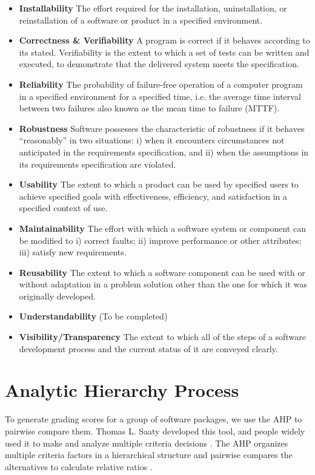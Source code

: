 \begin{itemize}
	\label{def_installability}
	\item \textbf{Installability} The effort required for the installation, uninstallation, or reinstallation of a software or product in a specified environment.
	\label{def_correctness_verifiability}
	\item \textbf{Correctness \& Verifiability} A program is correct if it behaves according to its stated. Verifiability is the extent to which a set of tests can be written and executed, to demonstrate that the delivered system meets the specification.
	\label{def_reliability}
	\item \textbf{Reliability} The probability of failure-free operation of a computer program in a specified environment for a specified time, i.e. the average time interval between two failures also known as the mean time to failure (MTTF).
	\label{def_robustness}
	\item \textbf{Robustness} Software possesses the characteristic of robustness if it behaves ``reasonably'' in two situations: i) when it encounters circumstances not anticipated in the requirements specification, and ii) when the assumptions in its requirements specification are violated.
	\label{def_usability}
	\item \textbf{Usability} The extent to which a product can be used by specified users to achieve specified goals with effectiveness, efficiency, and satisfaction in a specified context of use.
	\label{def_maintainability}
	\item \textbf{Maintainability} The effort with which a software system or component can be modified to i) correct faults; ii) improve performance or other attributes; iii) satisfy new requirements.
	\label{def_reusability}
	\item \textbf{Reusability} The extent to which a software component can be used with or without adaptation in a problem solution other than the one for which it was originally developed.
	\label{def_understandability}
	\item \textbf{Understandability} (To be completed)
	\label{def_visibility_transparency}
	\item \textbf{Visibility/Transparency} The extent to which all of the steps of a software development process and the current status of it are conveyed clearly.
\end{itemize}

\section{Analytic Hierarchy Process}
\label{sec_AHP}
To generate grading scores for a group of software packages, we use the AHP to pairwise compare them. Thomas L. Saaty developed this tool, and people widely used it to make and analyze multiple criteria decisions \cite{VaidyaEtAl2006}. The AHP organizes multiple criteria factors in a hierarchical structure and pairwise compares the alternatives to calculate relative ratios \cite{Saaty1990}.

